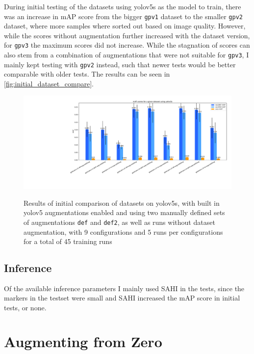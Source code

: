 \documentclass[10pt]{book}
\begin{document}
During initial testing of the datasets using yolov5s as the model to train, there was an increase in \ac{mAP} score from the bigger \texttt{gpv1} dataset to the smaller \texttt{gpv2} dataset, where more samples where sorted out based on image quality. However, while the scores without augmentation further increased with the dataset version, for \texttt{gpv3} the maximum scores did not increase. While the stagnation of scores can also stem from a combination of augmentations that were not suitable for \texttt{gpv3}, I mainly kept testing with \texttt{gpv2} instead, such that newer tests would be better comparable with older tests. The results can be seen in \autoref{fig:initial_dataset_compare}. %

\begin{figure}
  \caption{Results of initial comparison of datasets on yolov5s, with built in yolov5 augmentations enabled and using two manually defined sets of augmentations \texttt{def} and \texttt{def2}, as well as runs without dataset augmentation, with 9 configurations and 5 runs per configurations for a total of 45 training runs}
  \includegraphics[width=\textwidth]{image/yolov5s-dataset-compare}
  \label{fig:initial_dataset_compare}
\end{figure}

\subsection{Inference}

Of the available inference parameters I mainly used \ac{SAHI} in the tests, since the markers in the testset were small and \ac{SAHI} increased the \ac{mAP} score in initial tests, or none.

\section{Augmenting from Zero}
\end{document}
